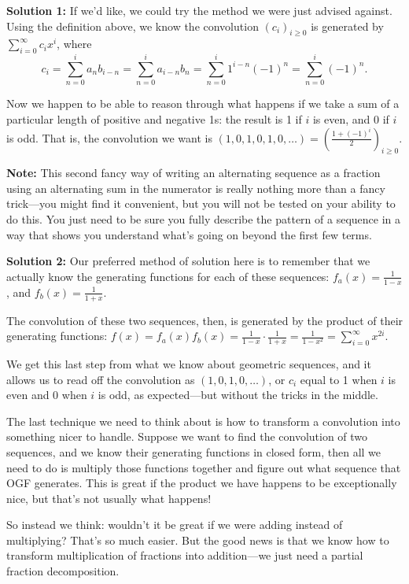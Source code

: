 \documentclass{article}
\theoremstyle{definition}
\begin{document}
\textbf{Solution 1:} If we'd like, we could try the method we were just advised against. Using the definition above, we know the convolution $\left(c_{i}\right)_{i \geq 0}$ is generated by $\sum_{i=0}^{\infty} c_{i} x^{i}$, where
\[c_{i}=\sum_{n=0}^{i} a_{n} b_{i-n}=\sum_{n=0}^{i} a_{i-n} b_{n}=\sum_{n=0}^{i} 1^{i-n}(-1)^{n}=\sum_{n=0}^{i}(-1)^{n}.\]

Now we happen to be able to reason through what happens if we take a sum of a particular length of positive and negative 1s: the result is 1 if $i$ is even, and 0 if $i$ is odd. That is, the convolution we want is $(1,0,1,0,1,0, \ldots)=\left(\frac{1+(-1)^{i}}{2}\right)_{i \geq 0}$.

\textbf{Note:} This second fancy way of writing an alternating sequence as a fraction using an alternating sum in the numerator is really nothing more than a fancy trick---you might find it convenient, but you will not be tested on your ability to do this. You just need to be sure you fully describe the pattern of a sequence in a way that shows you understand what's going on beyond the first few terms.

\textbf{Solution 2:} Our preferred method of solution here is to remember that we actually know the generating functions for each of these sequences: $f_{a}(x)=\frac{1}{1-x}$, and $f_{b}(x)=\frac{1}{1+x}$.

The convolution of these two sequences, then, is generated by the product of their generating functions: $f(x)=f_{a}(x) f_{b}(x)=\frac{1}{1-x} \cdot \frac{1}{1+x}=\frac{1}{1-x^{2}}=\sum_{i=0}^{\infty} x^{2 i}$.

We get this last step from what we know about geometric sequences, and it allows us to read off the convolution as $(1,0,1,0, \ldots)$, or $c_{i}$ equal to 1 when $i$ is even and 0 when $i$ is odd, as expected---but without the tricks in the middle.

The last technique we need to think about is how to transform a convolution into something nicer to handle. Suppose we want to find the convolution of two sequences, and we know their generating functions in closed form, then all we need to do is multiply those functions together and figure out what sequence that OGF generates. This is great if the product we have happens to be exceptionally nice, but that's not usually what happens!

So instead we think: wouldn't it be great if we were adding instead of multiplying? That's so much easier. But the good news is that we know how to transform multiplication of fractions into addition---we just need a partial fraction decomposition.
\end{document}
